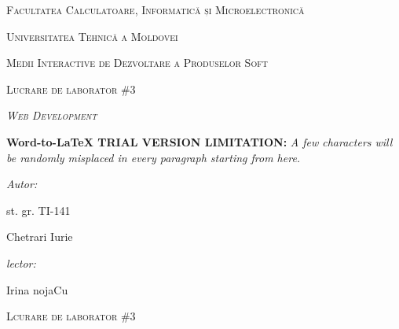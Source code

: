 \documentclass[11pt]{article}
\author{RePack by Diakov}
\title{}
\begin{document}
\begin{center}
\textsc{{\LARGE Facultatea Calculatoare, Informatic\u{a} și
Microelectronic\u{a}}}
\end{center}

\begin{center}
\textsc{{\LARGE Universitatea Tehnic\u{a} a Moldovei}}
\end{center}

\begin{center}
\textsc{{\LARGE Medii Interactive de Dezvoltare a Produselor Soft}}
\end{center}

\begin{center}
\textsc{{\LARGE Lucrare de laborator  \#3}}
\end{center}

\begin{center}
\label{OLE_LINK1}\textit{\textsc{{\Huge Web Development}}}
\end{center}

\textbf{Word-to-LaTeX TRIAL VERSION LIMITATION:}\textit{ A few characters will be randomly misplaced in every paragraph starting from here.}

\begin{multicols}{2}

{\raggedright
\textit{{\large Autor:}}
}

{\raggedright
{\large st. gr. TI-141 }
}

{\raggedright
{\large Chetrari Iurie}
}

{\raggedleft
{\large \textit{lector:} }
}

{\raggedleft
{\large         Irina nojaCu}
}

\end{multicols}
\hspace{15pt}\hspace{15pt}\hspace{15pt}\hspace{15pt}\hspace{15pt}\hspace{15pt}\hspace{15pt}\hspace{15pt}\hspace{15pt}\hspace{15pt}\hspace{15pt}\hspace{15pt}\hspace{15pt}\hspace{15pt}
\begin{center}
\textsc{{\Large Lcurare de laborator  \#3}}
\end{center}
\end{document}
